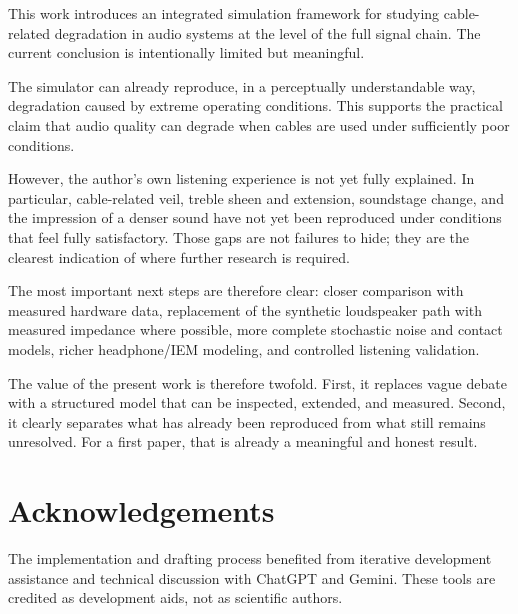\documentclass[a4paper,11pt]{article}
\begin{document}
This work introduces an integrated simulation framework for studying
cable-related degradation in audio systems at the level of the full signal
chain. The current conclusion is intentionally limited but meaningful.

The simulator can already reproduce, in a perceptually understandable way,
degradation caused by extreme operating conditions. This supports the practical
claim that audio quality can degrade when cables are used under sufficiently
poor conditions.

However, the author's own listening experience is not yet fully explained. In
particular, cable-related veil, treble sheen and extension, soundstage change,
and the impression of a denser sound have not yet been reproduced under
conditions that feel fully satisfactory. Those gaps are not failures to hide;
they are the clearest indication of where further research is required.

The most important next steps are therefore clear: closer comparison with
measured hardware data, replacement of the synthetic loudspeaker path with
measured impedance where possible, more complete stochastic noise and contact
models, richer headphone/IEM modeling, and controlled listening validation.

The value of the present work is therefore twofold. First, it replaces vague
debate with a structured model that can be inspected, extended, and measured.
Second, it clearly separates what has already been reproduced from what still
remains unresolved. For a first paper, that is already a meaningful and honest
result.

\section*{Acknowledgements}

The implementation and drafting process benefited from iterative development
assistance and technical discussion with ChatGPT and Gemini. These tools are
credited as development aids, not as scientific authors.
\end{document}

